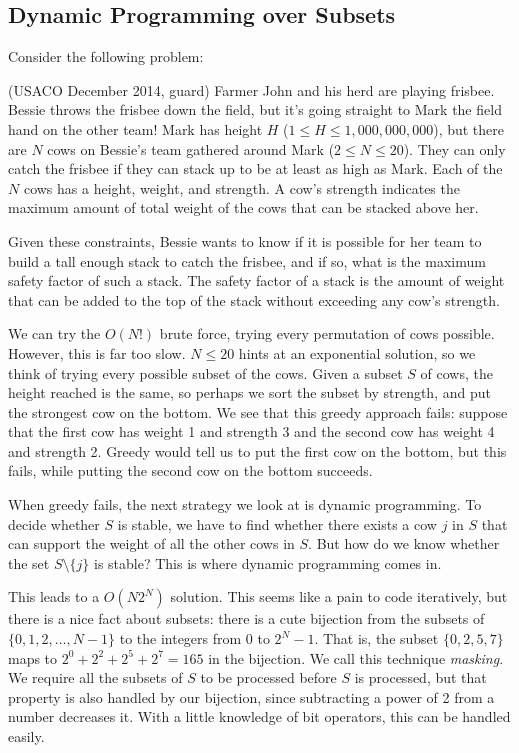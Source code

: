 \documentclass[11pt]{book}
\begin{document}
\subsection{Dynamic Programming over Subsets}

Consider the following problem:

(USACO December 2014, guard)
Farmer John and his herd are playing frisbee.  Bessie throws the
frisbee down the field, but it's going straight to Mark the field hand
on the other team!  Mark has height $H$ ($1 \le H \le 1,000,000,000$), but
there are $N$ cows on Bessie's team gathered around Mark ($2 \le N \le 20$).
They can only catch the frisbee if they can stack up to be at least as
high as Mark.  Each of the $N$ cows has a height, weight, and strength.
A cow's strength indicates the maximum amount of total weight of the
cows that can be stacked above her.  

Given these constraints, Bessie wants to know if it is possible for
her team to build a tall enough stack to catch the frisbee, and if so,
what is the maximum safety factor of such a stack.  The safety factor
of a stack is the amount of weight that can be added to the top of the
stack without exceeding any cow's strength.

We can try the $O(N!)$ brute force, trying every permutation of cows possible. However, this is far too slow. $N \le 20$ hints at an exponential solution, so we think of trying every possible subset of the cows. Given a subset $S$ of cows, the height reached is the same, so perhaps we sort the subset by strength, and put the strongest cow on the bottom. We see that this greedy approach fails: suppose that the first cow has weight 1 and strength 3 and the second cow has weight 4 and strength 2. Greedy would tell us to put the first cow on the bottom, but this fails, while putting the second cow on the bottom succeeds.

When greedy fails, the next strategy we look at is dynamic programming. To decide whether $S$ is stable, we have to find whether there exists a cow $j$ in $S$ that can support the weight of all the other cows in $S$. But how do we know whether the set $S \setminus \{j\}$ is stable? This is where dynamic programming comes in.

This leads to a $O(N 2^N)$ solution. This seems like a pain to code iteratively, but there is a nice fact about subsets: there is a cute bijection from the subsets of $\{0,1,2, \ldots, N-1\}$ to the integers from 0 to $2^N - 1$. That is, the subset $\{0,2,5,7\}$ maps to $2^0 + 2^2 + 2^5 + 2^7 = 165$ in the bijection. We call this technique \textit{masking}. We require all the subsets of $S$ to be processed before $S$ is processed, but that property is also handled by our bijection, since subtracting a power of 2 from a number decreases it. With a little knowledge of bit operators, this can be handled easily.
\end{document}
